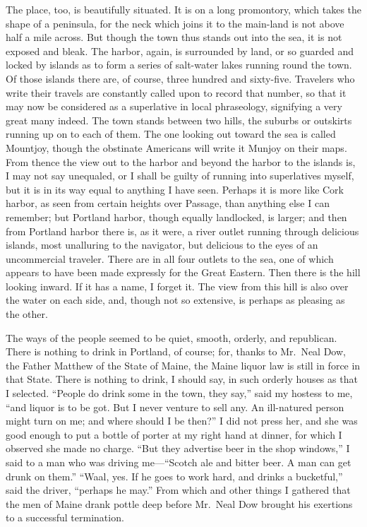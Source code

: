 The place, too, is beautifully situated.  It is on a long
promontory, which takes the shape of a peninsula, for the neck
which joins it to the main-land is not above half a mile across.
But though the town thus stands out into the sea, it is not exposed
and bleak.  The harbor, again, is surrounded by land, or so guarded
and locked by islands as to form a series of salt-water lakes
running round the town.  Of those islands there are, of course,
three hundred and sixty-five.  Travelers who write their travels
are constantly called upon to record that number, so that it may
now be considered as a superlative in local phraseology, signifying
a very great many indeed.  The town stands between two hills, the
suburbs or outskirts running up on to each of them.  The one
looking out toward the sea is called Mountjoy, though the obstinate
Americans will write it Munjoy on their maps.  From thence the view
out to the harbor and beyond the harbor to the islands is, I may
not say unequaled, or I shall be guilty of running into
superlatives myself, but it is in its way equal to anything I have
seen.  Perhaps it is more like Cork harbor, as seen from certain
heights over Passage, than anything else I can remember; but
Portland harbor, though equally landlocked, is larger; and then
from Portland harbor there is, as it were, a river outlet running
through delicious islands, most unalluring to the navigator, but
delicious to the eyes of an uncommercial traveler.  There are in
all four outlets to the sea, one of which appears to have been made
expressly for the Great Eastern.  Then there is the hill looking
inward.  If it has a name, I forget it.  The view from this hill is
also over the water on each side, and, though not so extensive, is
perhaps as pleasing as the other.

The ways of the people seemed to be quiet, smooth, orderly, and
republican.  There is nothing to drink in Portland, of course; for,
thanks to Mr.\ Neal Dow, the Father Matthew of the State of Maine,
the Maine liquor law is still in force in that State.  There is
nothing to drink, I should say, in such orderly houses as that I
selected.  ``People do drink some in the town, they say,'' said my
hostess to me, ``and liquor is to be got.  But I never venture to
sell any.  An ill-natured person might turn on me; and where should
I be then?''  I did not press her, and she was good enough to put a
bottle of porter at my right hand at dinner, for which I observed
she made no charge.  ``But they advertise beer in the shop windows,''
I said to a man who was driving me---``Scotch ale and bitter beer.  A
man can get drunk on them.''  ``Waal, yes.  If he goes to work hard,
and drinks a bucketful,'' said the driver, ``perhaps he may.''  From
which and other things I gathered that the men of Maine drank
pottle deep before Mr.\ Neal Dow brought his exertions to a
successful termination.

